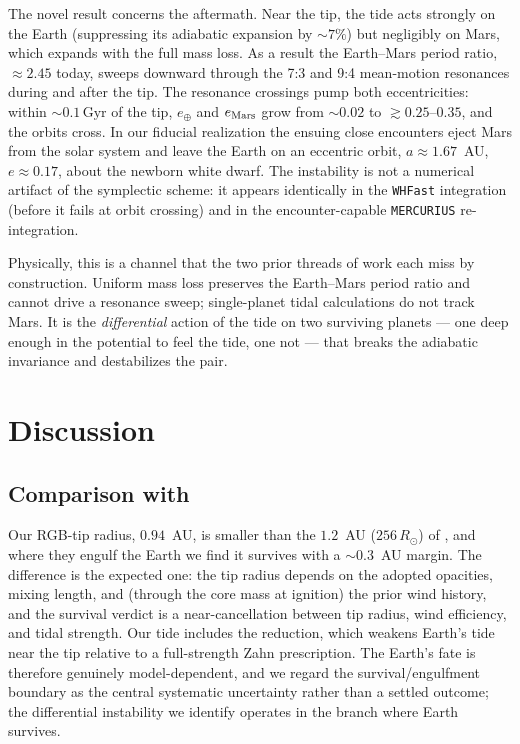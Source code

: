 \documentclass[twocolumn]{aastex631}
\newcommand{\rsun}{R_\odot}
\newcommand{\gyr}{\,\mathrm{Gyr}}
\newcommand{\code}[1]{\texttt{#1}}
\begin{document}
The novel result concerns the aftermath. Near the tip, the tide acts strongly on the
Earth (suppressing its adiabatic expansion by $\sim7\%$) but negligibly on Mars,
which expands with the full mass loss. As a result the Earth--Mars period ratio,
$\approx2.45$ today, sweeps downward through the 7:3 and 9:4 mean-motion resonances
during and after the tip. The resonance crossings pump both eccentricities: within
$\sim0.1\gyr$ of the tip, $e_\oplus$ and $e_{\rm Mars}$ grow from $\sim0.02$ to
$\gtrsim0.25$--$0.35$, and the orbits cross. In our fiducial realization the ensuing
close encounters eject Mars from the solar system and leave the Earth on an
eccentric orbit, $a\approx1.67$~AU, $e\approx0.17$, about the newborn white dwarf.
The instability is not a numerical artifact of the symplectic scheme: it appears
identically in the \code{WHFast} integration (before it fails at orbit crossing) and
in the encounter-capable \code{MERCURIUS} re-integration.

Physically, this is a channel that the two prior threads of work each miss by
construction. Uniform mass loss \citep{DuncanLissauer1998} preserves the Earth--Mars
period ratio and cannot drive a resonance sweep; single-planet tidal calculations
\citep{Schroder2008} do not track Mars. It is the \emph{differential} action of the
tide on two surviving planets --- one deep enough in the potential to feel the tide,
one not --- that breaks the adiabatic invariance and destabilizes the pair.

\section{Discussion}
\label{sec:discussion}

\subsection{Comparison with \citet{Schroder2008}}

Our RGB-tip radius, $0.94$~AU, is smaller than the $1.2$~AU ($256\,\rsun$) of
\citet{Schroder2008}, and where they engulf the Earth we find it survives with a
$\sim0.3$~AU margin. The difference is the expected one: the tip radius depends on
the adopted opacities, mixing length, and (through the core mass at ignition) the
prior wind history, and the survival verdict is a near-cancellation between tip
radius, wind efficiency, and tidal strength. Our tide includes the
\citet{GoldreichNicholson1977} reduction, which weakens Earth's tide near the tip
relative to a full-strength Zahn prescription. The Earth's fate is therefore
genuinely model-dependent, and we regard the survival/engulfment boundary as the
central systematic uncertainty rather than a settled outcome; the differential
instability we identify operates in the branch where Earth survives.
\end{document}
